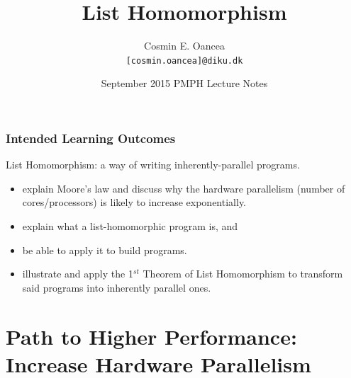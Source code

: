 \documentclass{beamer}
\title[Intro]{List Homomorphism}
\author[C.~Oancea]{Cosmin E. Oancea\\{\tt [cosmin.oancea]@diku.dk}}
\institute{Department of Computer Science (DIKU)\\University of Copenhagen}
\date[Sept 2015]{September 2015 PMPH Lecture Notes}
\begin{document}
\titleslide




\begin{frame}[fragile,t]
\frametitle{Intended Learning Outcomes}

List Homomorphism: a way of writing inherently-parallel programs.
\bigskip

\begin{itemize}
    \item explain Moore's law and discuss why the hardware parallelism (number of cores/processors) 
            is likely to increase exponentially.\bigskip
    \item explain what a list-homomorphic program is, and 
    \item be able to apply it to build programs.\bigskip
    \item illustrate and apply the 1$^{st}$ Theorem of List Homomorphism 
                to transform said programs into inherently parallel ones.
\end{itemize}
\end{frame}


\section{Path to Higher Performance: Increase Hardware Parallelism}
\end{document}
